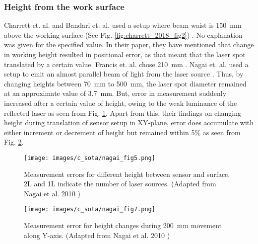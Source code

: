    
    \subsubsection{Height from the work surface}
    Charrett et. al. and Bandari et. al. used a setup where beam waist is \SI{150}{\milli\meter} above the working surface (See Fig. \ref{fig:charrett_2018_fig2}) \cite{charrett_2018, bandari}. No explanation was given for the specified value. In their paper, they have mentioned that change in working height resulted in positional error, as that meant that the laser spot translated by a certain value. Francis et. al. chose \SI{210}{\milli\meter} \cite{francis_autonomous}. Nagai et. al. used a setup to emit an almost parallel beam of light from the laser source \cite{nagai}. Thus, by changing heights between \SI{70}{\milli\meter} to \SI{500}{\milli\meter}, the laser spot diameter remained at an approximate value of \SI{3.7}{\milli\meter}. But, error in measurement suddenly increased after a certain value of height, owing to the weak luminance of the reflected laser as seen from Fig. \ref{fig:nagai_fig5}. Apart from this, their findings on changing height during translation of sensor setup in XY-plane, error does accumulate with either increment or decrement of height but remained within 5\% as seen from Fig. \ref{fig:nagai_fig7}.

    \begin{figure}[h]
        \centering
        \texttt{[image: images/c\_sota/nagai\_fig5.png]}
        \caption{Measurement errors for different height between sensor and surface. 2L and 1L indicate the number of laser sources. (Adapted from Nagai et al. 2010 \cite{nagai})}
        \label{fig:nagai_fig5}
    \end{figure}

    \begin{figure}[h]
        \centering
        \texttt{[image: images/c\_sota/nagai\_fig7.png]}
        \caption{Measurement error for height changes during \SI{200}{\milli\meter} movement along Y-axis. (Adapted from Nagai et al. 2010 \cite{nagai})}
        \label{fig:nagai_fig7}
    \end{figure}

